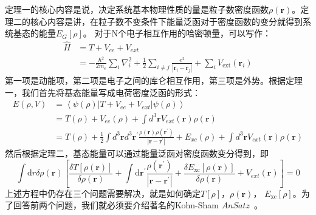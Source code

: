 定理一的核心内容是说，决定系统基本物理性质的量是粒子数密度函数$\rho(\mathbf{r})$。定理二的核心内容是讲，在粒子数不变条件下能量泛函对于密度函数的变分就得到系统基态的能量$E_{G}[\rho]$。
对于N个电子相互作用的哈密顿量，可以写作：
\begin{equation}
    \label{eq:2-11}
    \begin{aligned}
    \hat{H}&=T+V_{ee}+V_{ext}\\
    &=-\frac{\hbar^{2}}{2 m_{e}} \sum_{i} \nabla_{i}^{2}+\frac{1}{2} \sum_{i \neq j} \frac{e^{2}}{\left|\mathbf{r}_{i}-\mathbf{r}_{j}\right|}+\sum_{i} V_{\mathrm{ext}}\left(\mathbf{r}_{i}\right)
    \end{aligned}
\end{equation}
第一项是动能项，第二项是电子之间的库仑相互作用，第三项是外势。根据定理一，我们首先将基态能量写成电荷密度泛函的形式：
\begin{equation}
    \label{eq:2-12}
    \begin{aligned}
    E(\rho, V) &=\left\langle\psi(\rho)\left|T+V_{e e}+V_{e x t}\right| \psi(\rho)\right\rangle\\
    &=T(\rho)+V_{e e}(\rho)+\int d^{3} \mathbf{r} V_{e x t}(\mathbf{r}) \rho(\mathbf{r}) \\
    &=T(\rho)+\frac{1}{2} \int d^{3} \mathbf{r} d^{3} \mathbf{r}^{\prime} \frac{\rho(\mathbf{r}) \rho\left(\mathbf{r}^{\prime}\right)}{\left|\mathbf{r}-\mathbf{r}^{\prime}\right|}+E_{x c}(\rho)+\int d^{3} \mathbf{r} V_{e x t}(\mathbf{r}) \rho(\mathbf{r}) 
    \end{aligned}
\end{equation}
然后根据定理二，基态能量可以通过能量泛函对密度函数变分得到，即
\begin{equation}
    \label{eq:2-13}
    \int \mathrm{d} r \delta \rho(\boldsymbol{r})\left[\frac{\delta T[\rho(\boldsymbol{r})]}{\delta \rho(\boldsymbol{r})}+\int \mathrm{d} \boldsymbol{r}^{\prime} \frac{\rho\left(\boldsymbol{r}^{\prime}\right)}{\left|\boldsymbol{r}-\boldsymbol{r}^{\prime}\right|}+\frac{\delta E_{\mathrm{xc}}[\rho(\boldsymbol{r})]}{\delta \rho(\boldsymbol{r})}+V_{ext}(\boldsymbol{r})\right]=0
\end{equation}
上述方程中仍存在三个问题需要解决，就是如何确定$T[\rho]$，$\rho(\boldsymbol{r})$， $E_{\mathrm{xc}}[\rho]$。为了回答前两个问题，我们就必须要介绍著名的Kohn-Sham $\textit{AnSatz}$~\citep{Kohn-Sham,martin_2004}。

